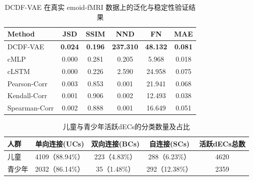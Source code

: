 \begin{table}[h]
	\caption{DCDF-VAE 在真实 emoid-fMRI 数据上的泛化与稳定性验证结果}
	\label{tab:emoid_difference}
	\centering
	\begin{tabular}{l|c|c|c|c|c}
		\hline
		Method & JSD & SSIM & NND & FN & MAE \\
		\hline
		DCDF-VAE & \textbf{0.024} & \textbf{0.196} & \textbf{237.310} & \textbf{48.132} & \textbf{0.081} \\
		cMLP & 0.000 & 0.281 & 0.205 & 5.968 & 0.018 \\
		cLSTM & 0.000 & 0.226 & 2.590 & 24.958 & 0.075 \\
		Pearson-Corr & 0.003 & 0.853 & 0.001 & 21.941 & 0.068 \\
		Kendall-Corr & 0.001 & 0.906 & 0.002 & 12.493 & 0.038 \\
		Spearman-Corr & 0.002 & 0.888 & 0.001 & 16.649 & 0.051 \\
		\hline
	\end{tabular}
\end{table}

\begin{table}[h]
  \caption{儿童与青少年活跃dECs的分类数量及占比}
  \label{tab:dec_ratio}
  \centering
  \begin{tabular}{l|c|c|c|c}
    \hline
    人群 & 单向连接(UCs) & 双向连接(BCs) & 自连接(SCs) & 活跃dECs总数 \\
    \hline
    儿童 & 4109（88.94\%） & 223（4.83\%） & 288（6.23\%） & 4620 \\
    青少年 & 2032（86.14\%） & 35（1.48\%） & 292（12.38\%） & 2359 \\
    \hline
  \end{tabular}
\end{table}
